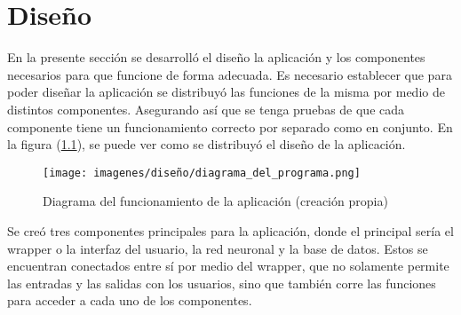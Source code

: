   \chapter{Diseño}
\label{C:desarrollo}

En la presente sección se desarrolló el diseño la aplicación y los componentes necesarios para que funcione de forma adecuada. Es necesario establecer que para poder diseñar la aplicación se distribuyó las funciones de la misma por medio de distintos componentes. Asegurando así que se tenga pruebas de que cada componente tiene un funcionamiento correcto por separado como en conjunto. En la figura (\ref{appdiagram}), se puede ver como se distribuyó el diseño de la aplicación.
\begin{figure}[H]
    \centering
    \texttt{[image: imagenes/diseño/diagrama\_del\_programa.png]}
    \caption{Diagrama del funcionamiento de la aplicación (creación propia)}
    \label{appdiagram}
\end{figure}
\par
Se creó tres componentes principales para la aplicación, donde el principal sería el wrapper o la interfaz del usuario, la red neuronal y la base de datos. Estos se encuentran conectados entre sí por medio del wrapper, que no solamente permite las entradas y las salidas con los usuarios, sino que también corre las funciones para acceder a cada uno de los componentes.


